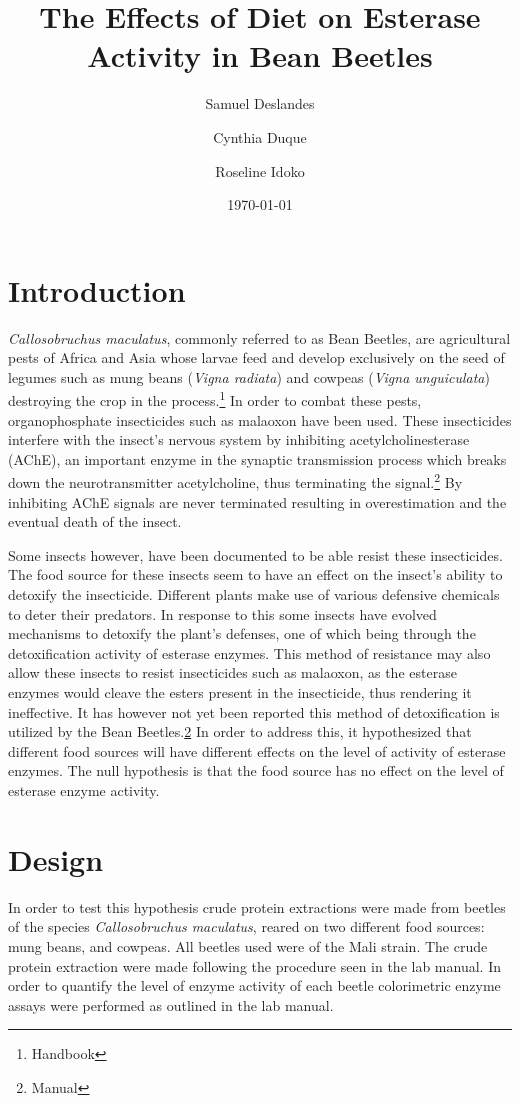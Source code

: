 \documentclass[12pt]{article}
\title{The Effects of Diet on Esterase Activity in Bean Beetles}
\author{Samuel Deslandes \and Cynthia Duque \and Roseline Idoko}
\date{\today}
\begin{document}
\maketitle


\doublespacing

\section{Introduction} 
	\textit{Callosobruchus maculatus}, commonly referred to as Bean Beetles, are agricultural pests of Africa and Asia whose larvae feed and develop exclusively on the seed of legumes such as mung beans (\textit{Vigna radiata}) and cowpeas (\textit{Vigna unguiculata}) destroying the crop in the process.\footnote{\label{Handbook}Handbook} In order to combat these pests, organophosphate insecticides such as malaoxon have been used. These insecticides interfere with the insect's nervous system by inhibiting acetylcholinesterase (AChE), an important enzyme in the synaptic transmission process which breaks down the neurotransmitter acetylcholine, thus terminating the signal.\footnote{\label{manual}Manual} By inhibiting AChE signals are never terminated resulting in overestimation and the eventual death of the insect. 
	
	Some insects however, have been documented to be able resist these insecticides. The food source for these insects seem to have an effect on the insect's ability to detoxify the insecticide. Different plants make use of various defensive chemicals to deter their predators. In response to this some insects have evolved mechanisms to detoxify the plant's defenses, one of which being through the detoxification activity of esterase enzymes. This method of resistance may also allow these insects to resist insecticides such as malaoxon, as the esterase enzymes would cleave the esters present in the insecticide, thus rendering it ineffective. It has however not yet been reported this method of detoxification is utilized by the Bean Beetles.\cref{manual} In order to address this, it hypothesized that different food sources will have different effects on the level of activity of esterase enzymes. The null hypothesis is that the food source has no effect on the level of esterase enzyme activity. 
	
\section{Design}
	In order to test this hypothesis crude protein extractions were made from beetles of the species \textit{Callosobruchus maculatus}, reared on two different food sources: mung beans, and cowpeas. All beetles used were of the Mali strain. The crude protein extraction were made following the procedure seen in the lab manual. In order to quantify the level of enzyme activity of each beetle colorimetric enzyme assays were performed as outlined in the lab manual. 
\end{document}
